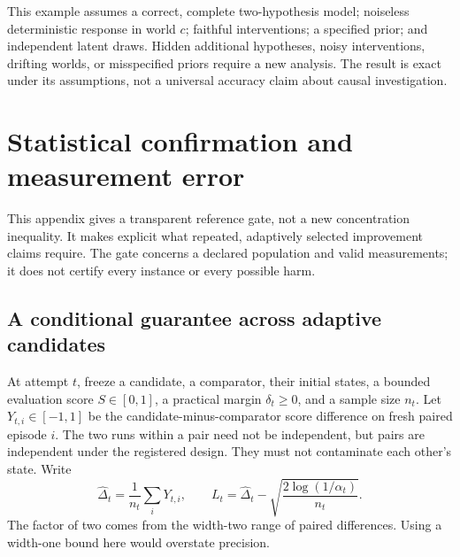\documentclass[11pt,letterpaper]{article}
\theoremstyle{remark}\newtheorem{remark}{Remark}[section]
\begin{document}
This example assumes a correct, complete two-hypothesis model; noiseless deterministic response in world $c$; faithful interventions; a specified prior; and independent latent draws. Hidden additional hypotheses, noisy interventions, drifting worlds, or misspecified priors require a new analysis. The result is exact under its assumptions, not a universal accuracy claim about causal investigation.

\section{Statistical confirmation and measurement error}
\label{app:statistics}
This appendix gives a transparent reference gate, not a new concentration inequality. It makes explicit what repeated, adaptively selected improvement claims require. The gate concerns a declared population and valid measurements; it does not certify every instance or every possible harm.

\subsection{A conditional guarantee across adaptive candidates}
At attempt $t$, freeze a candidate, a comparator, their initial states, a bounded evaluation score $S\in[0,1]$, a practical margin $\delta_t\geq0$, and a sample size $n_t$. Let $Y_{t,i}\in[-1,1]$ be the candidate-minus-comparator score difference on fresh paired episode $i$. The two runs within a pair need not be independent, but pairs are independent under the registered design. They must not contaminate each other's state. Write
\begin{equation}
\widehat\Delta_t=\frac1{n_t}\sum_iY_{t,i},\qquad
L_t=\widehat\Delta_t-\sqrt{\frac{2\log(1/\alpha_t)}{n_t}}.
\label{eq:lcb}
\end{equation}
The factor of two comes from the width-two range of paired differences. Using a width-one bound here would overstate precision.
\end{document}

